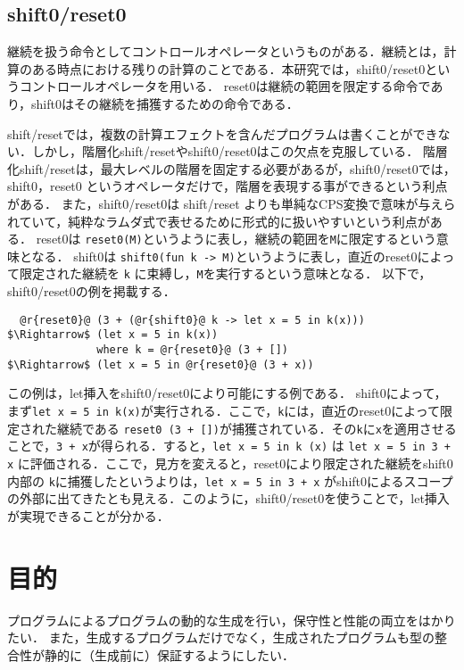 \documentclass[10pt,a4j,twocolumn]{jarticle}
\theoremstyle{definition}
\begin{document}
\subsection{shift0/reset0}
継続を扱う命令としてコントロールオペレータというものがある．継続とは，計算のある時点における残りの計算のことである．本研究では，shift0/reset0というコントロールオペレータを用いる．
reset0は継続の範囲を限定する命令であり，shift0はその継続を捕獲するための命令である．

shift/reset\cite{Danvy1990}では，複数の計算エフェクトを含んだプログラムは書くことができない．しかし，階層化shift/resetやshift0/reset0はこの欠点を克服している．
階層化shift/reset\cite{Danvy1990}は，最大レベルの階層を固定する必要があるが，shift0/reset0では，shift0，reset0 というオペレータだけで，階層を表現する事ができるという利点がある．
また，shift0/reset0は shift/reset よりも単純なCPS変換で意味が与えられていて，純粋なラムダ式で表せるために形式的に扱いやすいという利点がある．
reset0は \lstinline|reset0(M)|というように表し，継続の範囲を\lstinline|M|に限定するという意味となる．
shift0は \lstinline|shift0(fun k -> M)|というように表し，直近のreset0によって限定された継続を \lstinline|k| に束縛し，\lstinline|M|を実行するという意味となる．
以下で，shift0/reset0の例を掲載する．

\begin{lstlisting}
  @r{reset0}@ (3 + (@r{shift0}@ k -> let x = 5 in k(x)))
$\Rightarrow$ (let x = 5 in k(x))
              where k = @r{reset0}@ (3 + [])
$\Rightarrow$ (let x = 5 in @r{reset0}@ (3 + x))
\end{lstlisting}
この例は，let挿入をshift0/reset0により可能にする例である．
shift0によって，まず\lstinline|let x = 5 in k(x)|が実行される．ここで，\lstinline|k|には，直近のreset0によって限定された継続である \lstinline|reset0 (3 + [])|が捕獲されている．その\lstinline|k|に\lstinline|x|を適用させることで，\lstinline|3 + x|が得られる．すると，\lstinline|let x = 5 in k (x)| は \lstinline|let x = 5 in 3 + x| に評価される．ここで，見方を変えると，reset0により限定された継続をshift0内部の \lstinline|k|に捕獲したというよりは，\lstinline|let x = 5 in 3 + x| がshift0によるスコープの外部に出てきたとも見える．このように，shift0/reset0を使うことで，let挿入が実現できることが分かる．

\section{目的}
プログラムによるプログラムの動的な生成を行い，保守性と性能の両立をはかりたい．
また，生成するプログラムだけでなく，生成されたプログラムも型の整合性が静的に（生成前に）保証するようにしたい．
\end{document}
